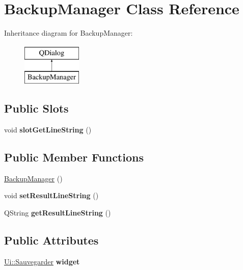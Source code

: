 \hypertarget{class_backup_manager}{\section{Backup\-Manager Class Reference}
\label{class_backup_manager}
}
Inheritance diagram for Backup\-Manager\-:\begin{figure}[H]
\begin{center}
\leavevmode
\includegraphics[height=2.000000cm]{class_backup_manager}
\end{center}
\end{figure}
\subsection*{Public Slots}
\begin{DoxyCompactItemize}
\item 
\hypertarget{class_backup_manager_aec816c9f295a4419a5523ff664de9d5f}{void {\bfseries slot\-Get\-Line\-String} ()}\label{class_backup_manager_aec816c9f295a4419a5523ff664de9d5f}

\end{DoxyCompactItemize}
\subsection*{Public Member Functions}
\begin{DoxyCompactItemize}
\item 
\hyperlink{class_backup_manager_a8c555a1a9d17fdde558f448ed8b52a2f}{Backup\-Manager} ()
\item 
\hypertarget{class_backup_manager_af6c9d8b1fd60f9b575e086e6e33e4539}{void {\bfseries set\-Result\-Line\-String} ()}\label{class_backup_manager_af6c9d8b1fd60f9b575e086e6e33e4539}

\item 
\hypertarget{class_backup_manager_a9a1e3b103ce4ce354e330aed439adca8}{Q\-String {\bfseries get\-Result\-Line\-String} ()}\label{class_backup_manager_a9a1e3b103ce4ce354e330aed439adca8}

\end{DoxyCompactItemize}
\subsection*{Public Attributes}
\begin{DoxyCompactItemize}
\item 
\hypertarget{class_backup_manager_a4cea8cd9cefa045a5cfcf9d7c4667e5c}{\hyperlink{class_ui_1_1_sauvegarder}{Ui\-::\-Sauvegarder} {\bfseries widget}}\label{class_backup_manager_a4cea8cd9cefa045a5cfcf9d7c4667e5c}

\end{DoxyCompactItemize}


